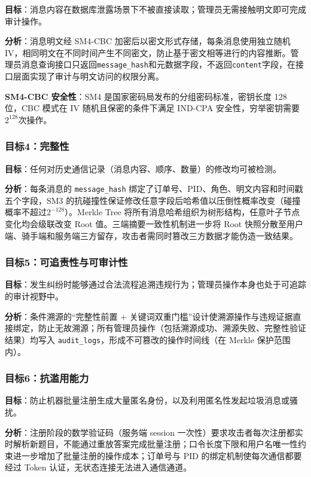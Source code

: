 \textbf{目标}：消息内容在数据库泄露场景下不被直接读取；管理员无需接触明文即可完成审计操作。

\textbf{分析}：消息明文经 SM4-CBC 加密后以密文形式存储，每条消息使用独立随机 IV，相同明文在不同时间产生不同密文，防止基于密文相等进行的内容推断。管理员消息查询接口只返回\texttt{message\_hash}和元数据字段，不返回\texttt{content}字段，在接口层面实现了审计与明文访问的权限分离。

\textbf{SM4-CBC 安全性}：SM4 是国家密码局发布的分组密码标准，密钥长度 128 位，CBC 模式在 IV 随机且保密的条件下满足 IND-CPA 安全性，穷举密钥需要$2^{128}$次操作。

\subsubsection*{目标4：完整性}

\textbf{目标}：任何对历史通信记录（消息内容、顺序、数量）的修改均可被检测。

\textbf{分析}：每条消息的 \texttt{message\_hash} 绑定了订单号、PID、角色、明文内容和时间戳五个字段，SM3 的抗碰撞性保证修改任意字段后哈希值以压倒性概率改变（碰撞概率不超过$2^{-128}$）。Merkle Tree 将所有消息哈希组织为树形结构，任意叶子节点变化均会级联改变 Root 值。三端摘要一致性机制进一步将 Root 快照分散至用户端、骑手端和服务端三方留存，攻击者需同时篡改三方数据才能伪造一致结果。

\subsubsection*{目标5：可追责性与可审计性}

\textbf{目标}：发生纠纷时能够通过合法流程追溯违规行为；管理员操作本身也处于可追踪的审计视野中。

\textbf{分析}：条件溯源的“完整性前置 + 关键词双重门槛”设计使溯源操作与违规证据直接绑定，防止无故溯源；所有管理员操作（包括溯源成功、溯源失败、完整性验证结果）均写入 \texttt{audit\_logs}，形成不可篡改的操作时间线（在 Merkle 保护范围内）。

\subsubsection*{目标6：抗滥用能力}

\textbf{目标}：防止机器批量注册生成大量匿名身份，以及利用匿名性发起垃圾消息或骚扰。

\textbf{分析}：注册阶段的数学验证码（服务端 session 一次性）要求攻击者每次注册都实时解析新题目，不能通过重放答案完成批量注册；口令长度下限和用户名唯一性约束进一步增加了批量注册的操作成本；订单号与 PID 的绑定机制使每次通信都要经过 Token 认证，无状态连接无法进入通信通道。

